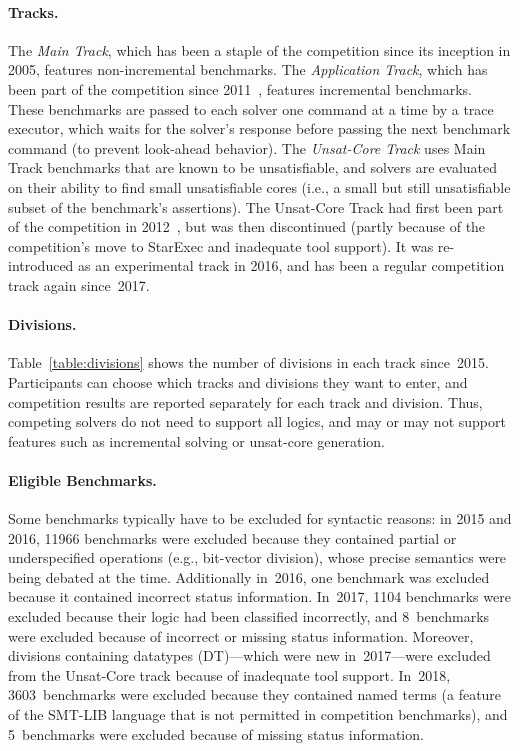 \documentclass[dvipsnames,table,twoside,11pt]{article}
\newcommand{\maintrack}{Main Track\xspace}
\newcommand{\apptrack}{Application Track\xspace}
\newcommand{\ucoretrack}{Unsat-Core Track\xspace}
\begin{document}
\paragraph{Tracks.}
The \emph{\maintrack}, which
has been a staple of the competition since its
inception in 2005, features non-incremental benchmarks.  The
\emph{\apptrack}, which has been part of the competition since
2011~\cite{BDdMOS13}, features incremental benchmarks.  These
benchmarks are passed to each solver one command at a time by a trace
executor, which waits for the solver's response before passing the
next benchmark command (to prevent look-ahead behavior).  The
\emph{\ucoretrack} uses \maintrack benchmarks that are known to
be unsatisfiable, and solvers are evaluated on their ability to find
small unsatisfiable cores (i.e., a small but still unsatisfiable
subset of the benchmark's assertions).  The \ucoretrack had first
been part of the competition in 2012~\cite{CGBD12}, but was then
discontinued (partly because of the competition's move to StarExec and
inadequate tool support).  It was re-introduced as an experimental track
in 2016, and has been a regular competition track again since~2017.

\paragraph{Divisions.}
Table~\ref{table:divisions} shows the number of divisions in each
track since~2015.  Participants can choose which tracks and divisions
they want to enter, and competition results are reported separately
for each track and division.  Thus, competing solvers do not need to support
all logics, and may or may not support features such as incremental solving
or unsat-core generation.

\paragraph{Eligible Benchmarks.}
Some benchmarks typically have to be
excluded for syntactic reasons: in 2015 and 2016, \num{11966} benchmarks
were excluded because they contained partial or underspecified
operations (e.g., bit-vector division), whose precise semantics were
being debated at the time.  Additionally in~2016, one benchmark was
excluded because it contained incorrect status information.  In~2017,
\num{1104} benchmarks were excluded because their logic had been classified
incorrectly, and 8~benchmarks were excluded because of incorrect or
missing status information.  Moreover, divisions containing datatypes
({DT})---which were new in~2017---were excluded from the Unsat-Core
track because of inadequate tool support.  In~2018, \num{3603}~benchmarks were
excluded because they contained named terms (a feature of the SMT-LIB
language that is not permitted in competition benchmarks), and
5~benchmarks were excluded because of missing status information.
\end{document}
